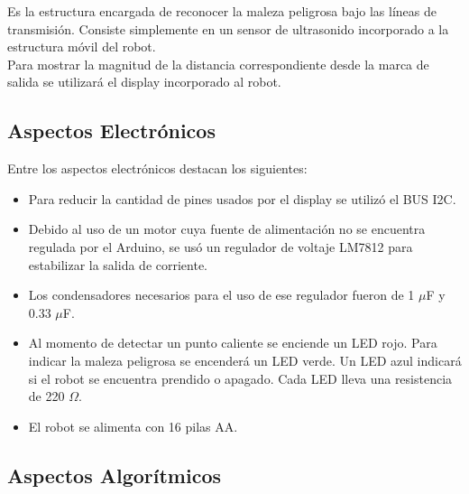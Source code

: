 \documentclass[conference]{IEEEtran}
\begin{document}
\bigskip

Es la estructura encargada de reconocer la maleza peligrosa bajo las líneas de transmisión. Consiste simplemente en un sensor de ultrasonido incorporado a la estructura móvil del robot.\\

Para mostrar la magnitud de la distancia correspondiente desde la marca de salida se utilizará el display incorporado al robot. \\



\bigskip

\subsection{Aspectos Electrónicos}
\bigskip


Entre los aspectos electrónicos destacan los siguientes:\\
 
\begin{itemize}
	\item Para reducir la cantidad de pines usados por el display se utilizó el BUS I2C.\\
	
	\item Debido al uso de un motor cuya fuente de alimentación no se encuentra regulada por el Arduino, se usó un regulador de voltaje LM7812 para estabilizar la salida de corriente.\\
	
	\item Los condensadores necesarios para el uso de ese regulador fueron de 1 $\mu$F y 0.33 $\mu$F.\\
	
	\item Al momento de detectar un punto caliente se enciende un LED rojo. Para indicar la maleza peligrosa se encenderá un LED verde. Un LED azul indicará si el robot se encuentra prendido o apagado. Cada LED lleva una resistencia de 220 $\Omega$.\\
	
	\item El robot se alimenta con 16 pilas AA.

\end{itemize}




\bigskip

\subsection{Aspectos Algorítmicos}
\bigskip
\end{document}
